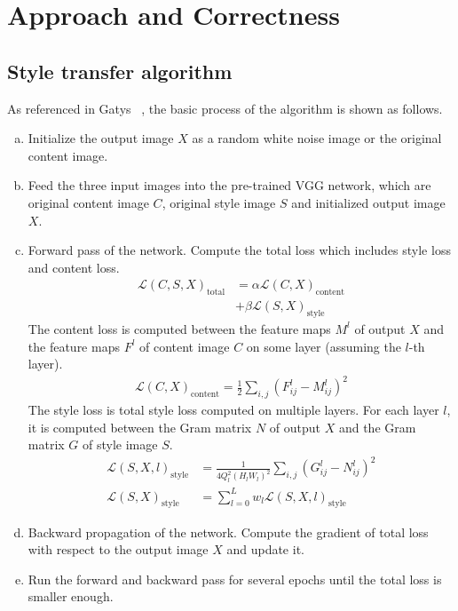 \documentclass[10pt,twocolumn,letterpaper]{article}
\begin{document}
\section{Approach and Correctness}

\subsection{Style transfer algorithm \cite{Authors01}}
\noindent As referenced in Gatys \etal~\cite{Authors01}, the basic process of the algorithm is shown as follows.
\begin{enumerate}[a.]
    \item Initialize the output image $X$ as a random white noise image or the original content image.
    \item Feed the three input images into the pre-trained VGG network, which are original content image $C$, original style image $S$ and initialized output image $X$.
    \item Forward pass of the network. Compute the total loss which includes style loss and content loss.
    \begin{align}
    \mathcal{L}(C,S,X)_{\text{total}} &= \alpha \mathcal{L}(C,X)_{\text{content}}\nonumber\\ &+ \beta \mathcal{L}(S,X)_{\text{style}}
\end{align}
The content loss is computed between the feature maps $M^l$ of output $X$ and the feature maps $F^l$ of content image $C$ on some layer (assuming the $l$-th layer).
\begin{align}
    \mathcal{L}(C,X)_{\text{content}} = \frac{1}{2}\sum_{i,j}{(F_{ij}^l - M_{ij}^l)^2}
\end{align}
The style loss is total style loss computed on multiple layers. For each layer $l$, it is computed between the Gram matrix $N$ of output $X$ and the Gram matrix $G$ of style image $S$.
\begin{align}
\mathcal{L}(S,X,l)_{\text{style}} &= \frac{1}{4Q_l^2(H_lW_l)^2}\sum_{i,j}(G_{ij}^l-N_{ij}^l)^2\\
    \mathcal{L}(S,X)_{\text{style}} &= \sum_{l=0}^L w_l \mathcal{L}(S,X,l)_{\text{style}}
\end{align}
\item Backward propagation of the network. Compute the gradient of total loss with respect to the output image $X$ and update it.
\item Run the forward and backward pass for several epochs until the total loss is smaller enough.
    
\end{enumerate}
\end{document}
